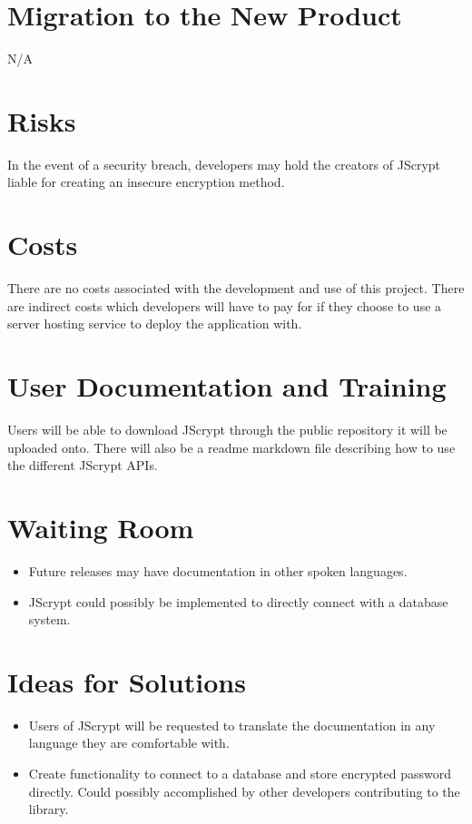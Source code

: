\documentclass[12pt]{article}
\begin{document}
\section {Migration to the New Product}
N/A  

\section {Risks}
In the event of a security breach, developers may hold the creators of JScrypt liable for creating an insecure encryption method.

\section {Costs}
There are no costs associated with the development and use of this project. There are indirect costs which developers will have to pay for if they choose to use a server hosting service to deploy the application with.

\section {User Documentation and Training}
Users will be able to download JScrypt through the public repository it will be uploaded onto. There will also be a readme markdown file describing how to use the different JScrypt APIs.

\section{Waiting Room}
\begin{itemize}
	\item Future releases may have documentation in other spoken languages.
	\item JScrypt could possibly be implemented to directly connect with a database system.
	\end{itemize}


\section{Ideas for Solutions}
\begin{itemize}
	\item Users of JScrypt will be requested to translate the documentation in any language they are comfortable with.
	\item Create functionality to connect to a database and store encrypted password directly. Could possibly accomplished by other developers contributing to the library.
	\end{itemize}
\end{document}
